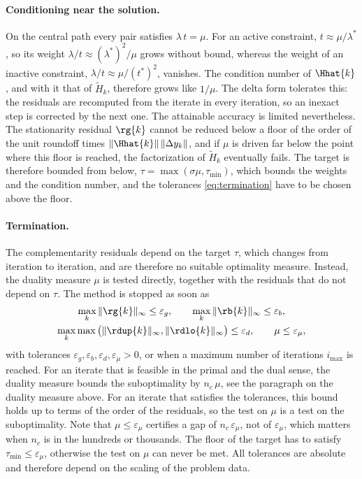 \paragraph{Conditioning near the solution.}
On the central path every pair satisfies $\lambda\, t = \mu$.
For an active constraint, $t \approx \mu / \lambda^*$, so its weight $\lambda / t \approx (\lambda^*)^2 / \mu$ grows without bound, whereas the weight of an inactive constraint, $\lambda / t \approx \mu / (t^*)^2$, vanishes.
The condition number of $\Hhat{k}$, and with it that of $\tilde{H}_k$, therefore grows like $1/\mu$.
The delta form tolerates this: the residuals are recomputed from the iterate in every iteration, so an inexact step is corrected by the next one.
The attainable accuracy is limited nevertheless.
The stationarity residual $\rg{k}$ cannot be reduced below a floor of the order of the unit roundoff times $\|\Hhat{k}\|\,\|\Delta y_k\|$, and if $\mu$ is driven far below the point where this floor is reached, the factorization of $\tilde{H}_k$ eventually fails.
The target is therefore bounded from below, $\tau = \max(\sigma\mu, \tau_{\min})$, which bounds the weights and the condition number, and the tolerances \eqref{eq:termination} have to be chosen above the floor.

\paragraph{Termination.}
The complementarity residuals depend on the target $\tau$, which changes from iteration to iteration, and are therefore no suitable optimality measure.
Instead, the duality measure $\mu$ is tested directly, together with the residuals that do not depend on $\tau$.
The method is stopped as soon as
\begin{equation} \label{eq:termination}
\begin{gathered}
    \max_{k} \|\rg{k}\|_\infty \leq \varepsilon_g , \qquad
    \max_{k} \|\rb{k}\|_\infty \leq \varepsilon_b , \\
    \max_{k} \max\big(\|\rdup{k}\|_\infty, \|\rdlo{k}\|_\infty\big) \leq \varepsilon_d , \qquad
    \mu \leq \varepsilon_\mu ,
\end{gathered}
\end{equation}
with tolerances $\varepsilon_g, \varepsilon_b, \varepsilon_d, \varepsilon_\mu > 0$, or when a maximum number of iterations $i_{\max}$ is reached.
For an iterate that is feasible in the primal and the dual sense, the duality measure bounds the suboptimality by $n_c\, \mu$, see the paragraph on the duality measure above.
For an iterate that satisfies the tolerances, this bound holds up to terms of the order of the residuals, so the test on $\mu$ is a test on the suboptimality.
Note that $\mu \leq \varepsilon_\mu$ certifies a gap of $n_c\, \varepsilon_\mu$, not of $\varepsilon_\mu$, which matters when $n_c$ is in the hundreds or thousands.
The floor of the target has to satisfy $\tau_{\min} \leq \varepsilon_\mu$, otherwise the test on $\mu$ can never be met.
All tolerances are absolute and therefore depend on the scaling of the problem data.

